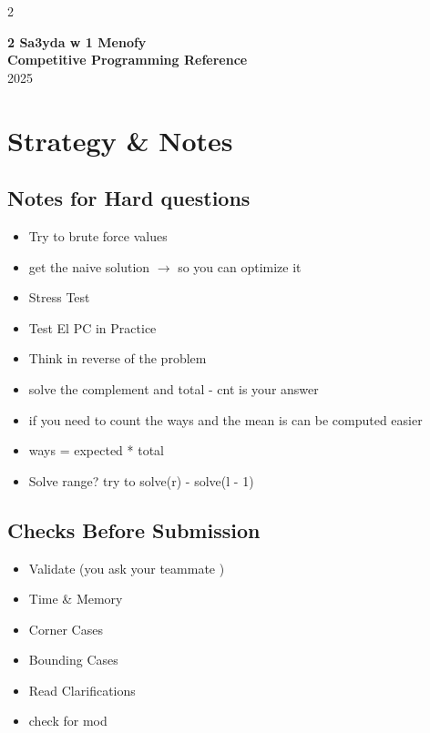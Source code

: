 \documentclass[10pt,a4paper]{extarticle}
\begin{document}
\begin{landscape}
\begin{multicols}{2}

\begin{center}
  {\sffamily\Large\bfseries 2 Sa3yda w 1 Menofy}\\[3pt]
  {\sffamily\normalsize\bfseries Competitive Programming Reference}\\[2pt]
  {\sffamily\small 2025}
\end{center}
\vspace{4pt}

\tableofcontents
\vspace{2ex}


\section{Strategy \& Notes}

\subsection{Notes for Hard questions}
\begin{itemize}
    \item Try to brute force values
    \item get the naive solution $\rightarrow$ so you can optimize it 
    \item Stress Test
    \item Test El PC in Practice
    \item Think in reverse of the problem
    \item solve the complement and total - cnt is your answer
    \item if you need to count the ways and the mean is can be computed easier 
    \item ways = expected * total
    \item Solve range? try to solve(r) - solve(l - 1)
\end{itemize}

\subsection{Checks Before Submission}
\begin{itemize}
    \item Validate (you ask your teammate )
    \item Time \& Memory
    \item Corner Cases
    \item Bounding Cases 
    \item Read Clarifications
    \item check for mod
\end{itemize}


\end{multicols}
\end{landscape}
\end{document}
